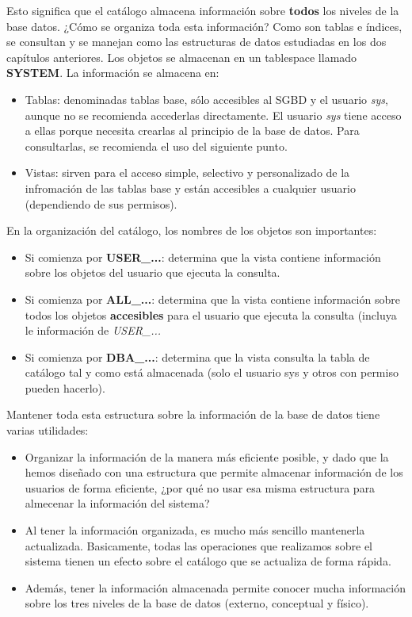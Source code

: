 Esto significa que el catálogo almacena información sobre \textbf{todos} los niveles de la base datos. ¿Cómo se organiza toda esta información? Como son tablas e índices, se consultan y se manejan como las estructuras de datos estudiadas en los dos capítulos anteriores. Los objetos se almacenan en un tablespace llamado \textbf{SYSTEM}. La información se almacena en:
\begin{itemize}
\item Tablas: denominadas tablas base, sólo accesibles al SGBD y el usuario \textit{sys}, aunque no se recomienda accederlas directamente. El usuario \textit{sys} tiene acceso a ellas porque necesita crearlas al principio de la base de datos. Para consultarlas, se recomienda el uso del siguiente punto.
\item Vistas: sirven para el acceso simple, selectivo y personalizado de la infromación de las tablas base y están accesibles a cualquier usuario (dependiendo de sus permisos).
\end{itemize}

En la organización del catálogo, los nombres de los objetos son importantes:
\begin{itemize}
\item Si comienza por \textbf{USER\_...}: determina que la vista contiene información sobre los objetos del usuario que ejecuta la consulta.
\item Si comienza por \textbf{ALL\_...}: determina que la vista contiene información sobre todos los objetos \textbf{accesibles} para el usuario que ejecuta la consulta (incluya le información de \textit{USER\_...}
\item Si comienza por \textbf{DBA\_...}: determina que la vista consulta la tabla de catálogo tal y como está almacenada (solo el usuario sys y otros con permiso pueden hacerlo).
\end{itemize}

Mantener toda esta estructura sobre la información de la base de datos tiene varias utilidades:
\begin{itemize}
\item Organizar la información de la manera más eficiente posible, y dado que la hemos diseñado con una estructura que permite almacenar información de los usuarios de forma eficiente, ¿por qué no usar esa misma estructura para almecenar la información del sistema?
\item Al tener la información organizada, es mucho más sencillo mantenerla actualizada. Basicamente, todas las operaciones que realizamos sobre el sistema tienen un efecto sobre el catálogo que se actualiza de forma rápida.
\item Además, tener la información almacenada permite conocer mucha información  sobre los tres niveles de la base de datos (externo, conceptual y físico). 
\end{itemize}

